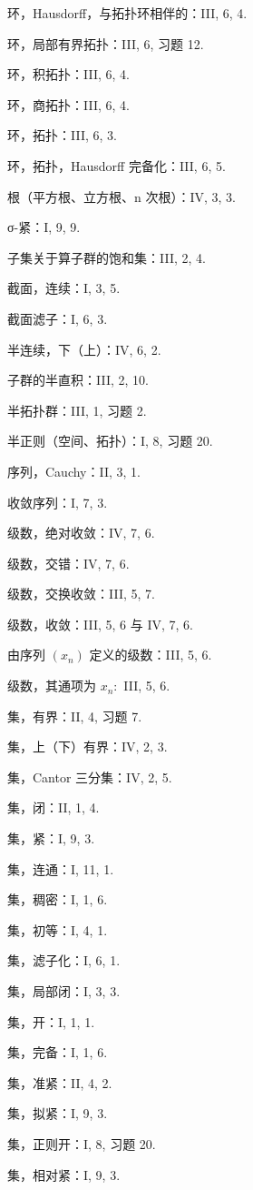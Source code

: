 环，Hausdorff，与拓扑环相伴的：III, 6, 4.

环，局部有界拓扑：III, 6, 习题 12.

环，积拓扑：III, 6, 4.

环，商拓扑：III, 6, 4.

环，拓扑：III, 6, 3.

环，拓扑，Hausdorff 完备化：III, 6, 5.

根（平方根、立方根、n 次根）：IV, 3, 3.

σ-紧：I, 9, 9.

子集关于算子群的饱和集：III, 2, 4.

截面，连续：I, 3, 5.

截面滤子：I, 6, 3.

半连续，下（上）：IV, 6, 2.

子群的半直积：III, 2, 10.

半拓扑群：III, 1, 习题 2.

半正则（空间、拓扑）：I, 8, 习题 20.

序列，Cauchy：II, 3, 1.

收敛序列：I, 7, 3.

级数，绝对收敛：IV, 7, 6.

级数，交错：IV, 7, 6.

级数，交换收敛：III, 5, 7.

级数，收敛：III, 5, 6 与 IV, 7, 6.

由序列 \((x_{n})\) 定义的级数：III, 5, 6.

级数，其通项为 \(x_{n} :\) III, 5, 6.

集，有界：II, 4, 习题 7.

集，上（下）有界：IV, 2, 3.

集，Cantor 三分集：IV, 2, 5.

集，闭：II, 1, 4.

集，紧：I, 9, 3.

集，连通：I, 11, 1.

集，稠密：I, 1, 6.

集，初等：I, 4, 1.

集，滤子化：I, 6, 1.

集，局部闭：I, 3, 3.

集，开：I, 1, 1.

集，完备：I, 1, 6.

集，准紧：II, 4, 2.

集，拟紧：I, 9, 3.

集，正则开：I, 8, 习题 20.

集，相对紧：I, 9, 3.

